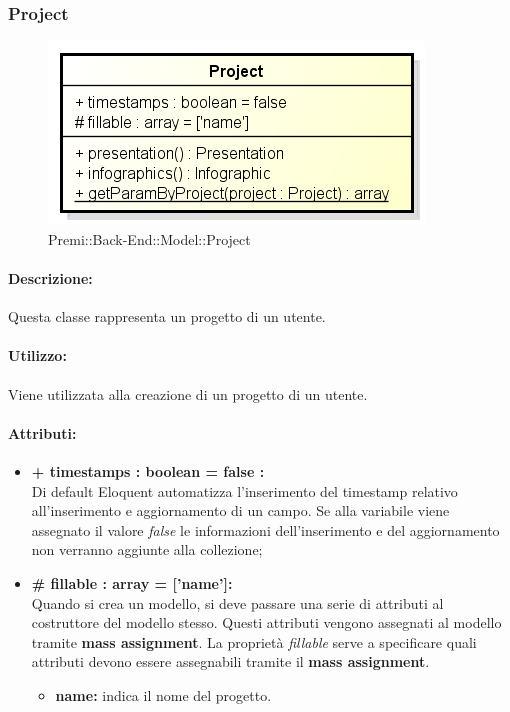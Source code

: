 \subsubsection{Project}

	\begin{figure}[h]
		\centering
		\includegraphics[width=0.5\linewidth]{img/back_end_premi_model_project}
		\caption[Premi::Back-End::Model::Project]{Premi::Back-End::Model::Project}
		\label{fig:back_end_premi_model_project}
	\end{figure}

	
	\paragraph{Descrizione:}
	Questa classe rappresenta un progetto di un utente.
	
	\paragraph{Utilizzo:}
	Viene utilizzata alla creazione di un progetto di un utente.
	
	\paragraph{Attributi:}
	\begin{itemize}
		\item \textbf{+ timestamps : boolean = false :}\\
		Di default Eloquent automatizza l'inserimento del timestamp relativo all'inserimento e aggiornamento di un campo. Se alla variabile viene assegnato il valore \textit{false} le informazioni dell'inserimento e del aggiornamento non verranno aggiunte alla collezione;
		\item \textbf{\# fillable : array = [’name’]:}\\
		Quando si crea un modello, si deve passare una serie di attributi al costruttore del modello stesso. Questi attributi vengono assegnati al modello tramite \textbf{mass assignment}. La proprietà \textit{fillable} serve a specificare quali attributi devono essere assegnabili tramite il \textbf{mass assignment}.
		\begin{itemize}
			\item \textbf{name:} indica il nome del progetto.
		\end{itemize}
	\end{itemize}
	
